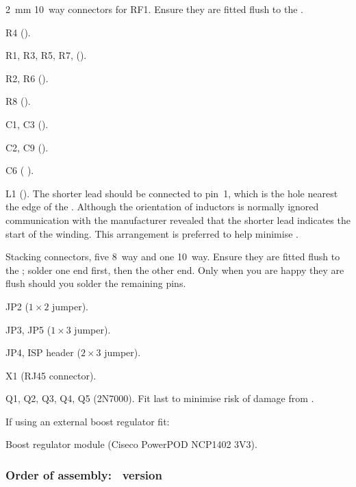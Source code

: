\begin{buildorder*}
\item \SI{2}{\milli\metre} 10~way connectors for RF1. Ensure they are
  fitted flush to the \pcb.
\item R4 ().
\item R1, R3, R5, R7, ().
\item R2, R6 ().
\item R8 ().
\item C1, C3 ().
\item C2, C9 ().
\item C6 ( ).
\item L1 (). The shorter lead should be connected to pin~1,
  which is the hole nearest the edge of the \pcb. Although the
  orientation of inductors is normally ignored communication with the
  manufacturer revealed that the shorter lead indicates the start of
  the winding. This arrangement is preferred to help minimise \rfi.
\item Stacking connectors, five 8~way and one 10~way. Ensure they are
  fitted flush to the \pcb; solder one end first, then the other
  end. Only when you are happy they are flush should you solder the
  remaining pins.
\item JP2 ($1 \times 2$ jumper).
\item JP3, JP5 ($1 \times 3$ jumper).
\item JP4, ISP header ($2 \times 3$ jumper).
\item X1 (RJ45 connector).
\item Q1, Q2, Q3, Q4, Q5 (2N7000). Fit last to minimise risk of damage
  from \esd.
\end{buildorder*}

If using an external boost regulator fit:
\begin{buildorder*}
\item Boost regulator module (Ciseco PowerPOD NCP1402 3V3).
\end{buildorder*}


\subsubsection[Order of assembly: PoE version]{%
  Order of assembly: \protect\PoE\ version}


